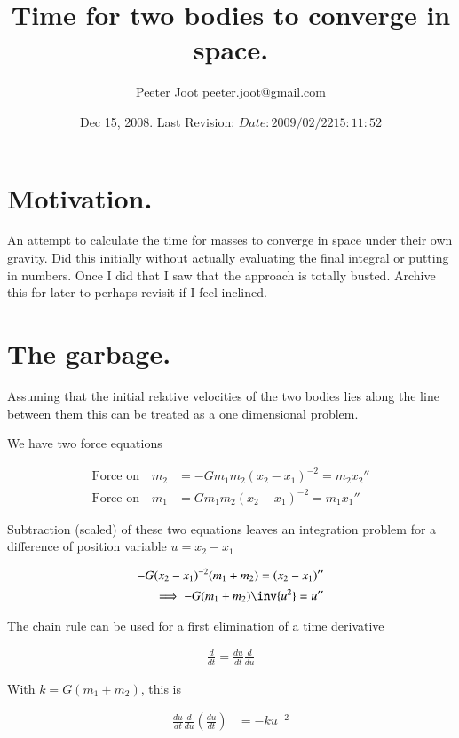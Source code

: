 \documentclass{article}
\title{ Time for two bodies to converge in space. }
\author{Peeter Joot \quad peeter.joot@gmail.com}
\date{ Dec 15, 2008.  Last Revision: $Date: 2009/02/22 15:11:52 $ }
\begin{document}
\maketitle{}


\section{ Motivation.}

An attempt to calculate the time for masses to converge in space under their own gravity.  Did this initially without actually evaluating the final
integral or putting in numbers.  Once I did that I saw that the approach is totally busted.  Archive this for later to perhaps revisit if I feel
inclined.

\section{ The garbage. }

Assuming that the initial relative velocities of the two bodies lies along
the line between them this can be treated as a one dimensional problem.

We have two force equations

\begin{align*}
\text{Force on} \quad m_2 &= - G m_1 m_2 (x_2 - x_1)^{-2} = m_2 {x_2}'' \\
\text{Force on} \quad m_1 &=  G m_1 m_2 (x_2 - x_1)^{-2} = m_1 {x_1}''
\end{align*}

Subtraction (scaled) of these two equations leaves an integration problem for a difference of position variable $u = x_2 - x_1$

\begin{align*}
- G (x_2 - x_1)^{-2} (m_1 + m_2)= (x_2 - x_1)'' \\
\implies
- G (m_1 + m_2) \inv{u^2} = u'' \\
\end{align*}

The chain rule can be used for a first elimination of a time derivative

\begin{align*}
\frac{d}{dt} = \frac{du}{dt} \frac{d}{du}
\end{align*}

With $k = G(m_1 + m_2)$, this is

\begin{align*}
\frac{du}{dt} \frac{d}{du} \left(\frac{du}{dt}\right) &= -k u^{-2}
\end{align*}
\end{document}

